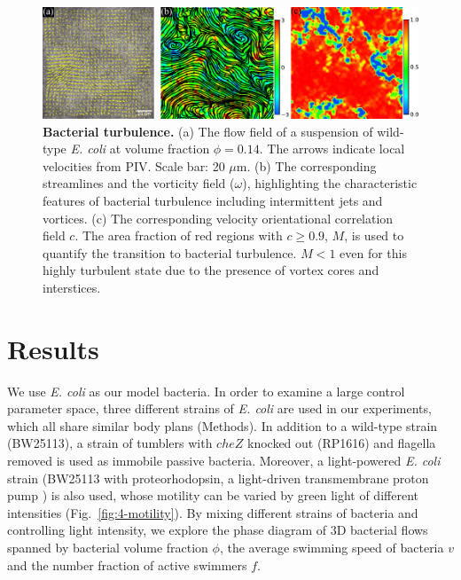 \begin{figure}[!hp]
	\begin{center}
	\includegraphics[width=5.5 in]{Figs/4-Emergence/1.pdf}
	\end{center}
	\caption[Bacterial Turbulence]
	{
	\textbf{Bacterial turbulence.}
  (a) The flow field of a suspension of wild-type \textit{E. coli} at volume fraction $\phi=0.14$. The arrows indicate local velocities from PIV. Scale bar: 20 $\mu$m.
  (b) The corresponding streamlines and the vorticity field ($\omega$), highlighting the characteristic features of bacterial turbulence including intermittent jets and vortices.
  (c) The corresponding velocity orientational correlation field $c$. The area fraction of red regions with $c \ge 0.9$, $M$, is used to quantify the transition to bacterial turbulence. $M < 1$ even for this highly turbulent state due to the presence of vortex cores and interstices.
	}
	\label{fig:4-turbulence}
\end{figure}



\section{Results}

We use  \textit{E. coli} as our model bacteria. In order to examine a large control parameter space, three different strains of \textit{E. coli} are used in our experiments, which all share similar body plans (Methods). In addition to a wild-type strain (BW25113), a strain of tumblers with $cheZ$ knocked out (RP1616) and flagella removed is used as immobile passive bacteria. Moreover, a light-powered
\textit{E. coli} strain (BW25113 with proteorhodopsin, a light-driven transmembrane proton pump \cite{Walter2007}) is also used, whose motility can be varied by green light of different intensities (Fig.~\ref{fig:4-motility}). By mixing different strains of bacteria and controlling light intensity, we explore the phase diagram of 3D bacterial flows spanned by bacterial volume fraction $\phi$, the average swimming speed of bacteria $v$ and the number fraction of active swimmers $f$.




